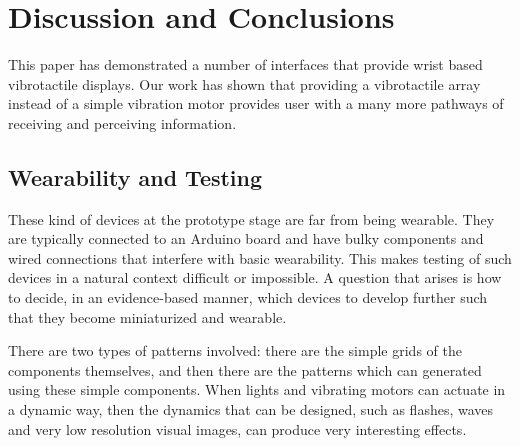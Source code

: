 \documentclass{chi-ext}
\begin{document}

\section{Discussion and Conclusions}
This paper has demonstrated a number of interfaces that provide wrist based vibrotactile displays. Our work has shown that providing a vibrotactile array instead of a simple vibration motor provides user with a many more pathways of receiving and perceiving information.

\subsection{Wearability and Testing}
These kind of devices at the prototype stage are far from being wearable. They are typically connected to an Arduino board and have bulky components and wired connections that interfere with basic wearability. This makes testing of such devices in a natural context difficult or impossible. A question that arises is how to decide, in an evidence-based manner, which devices to develop further such that they become miniaturized and wearable. 

There are two types of patterns involved: there are the simple grids of the components themselves, and then there are the patterns which can generated using these simple components. When lights and vibrating motors can actuate in a dynamic way, then the dynamics that can be designed, such as flashes, waves and very low resolution visual images, can produce very interesting effects. 
\end{document}
